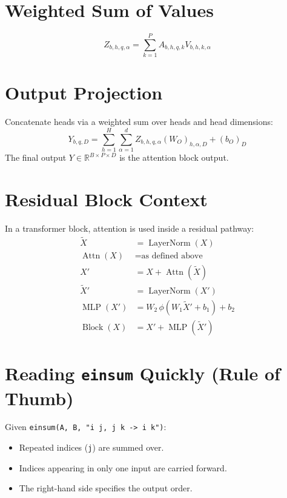 \documentclass[11pt]{article}
\begin{document}
\section*{Weighted Sum of Values}
\begin{equation}
Z_{b,h,q,\alpha} = \sum_{k=1}^{P} A_{b,h,q,k} V_{b,h,k,\alpha}
\end{equation}

\section*{Output Projection}
Concatenate heads via a weighted sum over heads and head dimensions:
\begin{equation}
Y_{b,q,D} = \sum_{h=1}^{H} \sum_{\alpha=1}^{d} Z_{b,h,q,\alpha} (W_O)_{h,\alpha,D} + (b_O)_D
\end{equation}
The final output $Y \in \mathbb{R}^{B \times P \times D}$ is the attention block output.

\section*{Residual Block Context}
In a transformer block, attention is used inside a residual pathway:
\begin{align}
\tilde{X} &= \operatorname{LayerNorm}(X) \\
\operatorname{Attn}(X) &= \text{as defined above} \\
X' &= X + \operatorname{Attn}(\tilde{X}) \\
\tilde{X}' &= \operatorname{LayerNorm}(X') \\
\operatorname{MLP}(X') &= W_2\,\phi(W_1 \tilde{X}' + b_1) + b_2 \\
\operatorname{Block}(X) &= X' + \operatorname{MLP}(\tilde{X}')
\end{align}

\section*{Reading \texttt{einsum} Quickly (Rule of Thumb)}
Given \texttt{einsum(A, B, "i j, j k -> i k")}:
\begin{itemize}
  \item Repeated indices (\texttt{j}) are summed over.
  \item Indices appearing in only one input are carried forward.
  \item The right-hand side specifies the output order.
\end{itemize}
\end{document}
